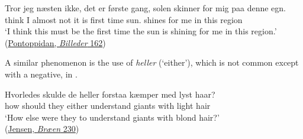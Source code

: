 \ex{}
\gll Tror jeg næsten ikke, det er første gang, solen skinner for mig paa denne egn.\\
 think I almost not it is first time sun.\DEF{} shines for me in this region\\
\glt `I think this must be the first time the sun is shining for me in this region.'
\hfill(\href{https://www.henrikpontoppidan.dk/text/kilder/boeger/landsbybilleder/vinterbillede.html}{Pontoppidan, \textit{Billeder} 162}) %

\z
\z

A similar phenomenon is the use of \textit{heller} (`either'), which is not common except with a negative, in .

\ea \label{ex:04-49}
\gll Hvorledes skulde de heller forstaa kæmper med lyst haar?\\
 how should they either understand giants with light hair\\
\glt `How else were they to understand giants with blond hair?'\\
\hfill(\href{https://archive.org/details/bren00jensgoog/page/n257/mode/2up?q=\%22Hvorledes+skulde+de+heller+forstaa+k%C3%A6mper+med\%22&view=theater}{Jensen, \textit{Bræen} 230})
\z
{}

 \label{sec:conditional}


